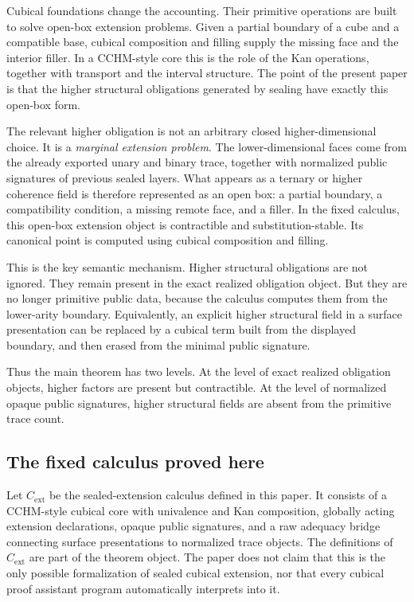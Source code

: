 Cubical foundations change the accounting.  Their primitive operations are built
to solve open-box extension problems.  Given a partial boundary of a cube and a
compatible base, cubical composition and filling supply the missing face and the
interior filler.  In a CCHM-style core this is the role of the Kan operations,
together with transport and the interval structure.  The point of the present
paper is that the higher structural obligations generated by sealing have exactly
this open-box form.

The relevant higher obligation is not an arbitrary closed higher-dimensional
choice.  It is a \emph{marginal extension problem}.  The lower-dimensional faces
come from the already exported unary and binary trace, together with normalized
public signatures of previous sealed layers.  What appears as a ternary or higher
coherence field is therefore represented as an open box: a partial boundary, a
compatibility condition, a missing remote face, and a filler.  In the fixed
calculus, this open-box extension object is contractible and substitution-stable.
Its canonical point is computed using cubical composition and filling.

This is the key semantic mechanism.  Higher structural obligations are not
ignored.  They remain present in the exact realized obligation object.  But they
are no longer primitive public data, because the calculus computes them from the
lower-arity boundary.  Equivalently, an explicit higher structural field in a
surface presentation can be replaced by a cubical term built from the displayed
boundary, and then erased from the minimal public signature.

Thus the main theorem has two levels.  At the level of exact realized obligation
objects, higher factors are present but contractible.  At the level of normalized
opaque public signatures, higher structural fields are absent from the primitive
trace count.

\subsection{The fixed calculus proved here}

Let \(C_{\mathrm{ext}}\) be the sealed-extension calculus defined in this paper.
It consists of a CCHM-style cubical core with univalence and Kan composition,
globally acting extension declarations, opaque public signatures, and a raw
adequacy bridge connecting surface presentations to normalized trace objects.
The definitions of \(C_{\mathrm{ext}}\) are part of the theorem object.  The paper
does not claim that this is the only possible formalization of sealed cubical
extension, nor that every cubical proof assistant program automatically
interprets into it.

